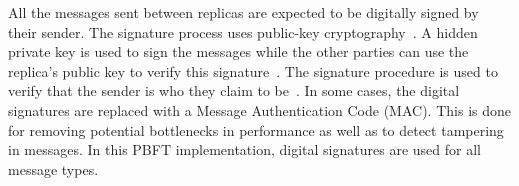 All the messages sent between replicas are expected to be digitally signed by their sender. The signature process uses public-key cryptography~\cite[p.~257,p.267]{BOOK:BuildDepDistSyst}. A hidden private key is used to sign the messages while the other parties can use the replica's public key to verify this signature~\cite[p.~417]{PAPER:PBFTRecovery}. The signature procedure is used to verify that the sender is who they claim to be~\cite[p.~3]{PAPER:OGPBFT}. In some cases, the digital signatures are replaced with a Message Authentication Code (MAC). This is done for removing potential bottlenecks in performance as well as to detect tampering in messages\cites[p.~257]{BOOK:BuildDepDistSyst}[p.~3,8]{PAPER:OGPBFT}. In this PBFT implementation, digital signatures are used for all message types.


